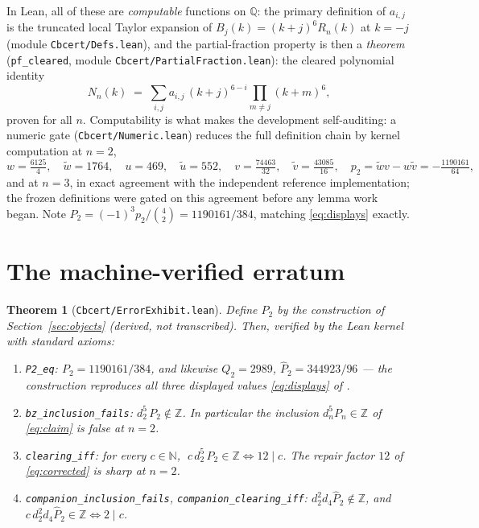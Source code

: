 \documentclass[11pt]{article}
\newtheorem{theorem}{Theorem}
\theoremstyle{definition}
\newcommand{\Z}{\mathbb{Z}}
\newcommand{\Q}{\mathbb{Q}}
\newcommand{\bin}[2]{\binom{#1}{#2}}
\newcommand{\wtd}{\widetilde}
\newcommand{\lean}[1]{\texttt{#1}}
\begin{document}
In Lean, all of these are \emph{computable} functions on $\Q$: the primary
definition of $a_{i,j}$ is the truncated local Taylor expansion of
$B_j(k) = (k+j)^6 R_n(k)$ at $k = -j$ (module \lean{Cbcert/Defs.lean}), and
the partial-fraction property is then a \emph{theorem}
(\lean{pf\_cleared}, module \lean{Cbcert/PartialFraction.lean}): the cleared
polynomial identity
\[
N_n(k) \;=\; \sum_{i,j} a_{i,j}\,(k+j)^{6-i}\prod_{m \ne j}(k+m)^6,
\]
proven for all $n$. Computability is what makes the development
self-auditing: a numeric gate (\lean{Cbcert/Numeric.lean}) reduces the full
definition chain by kernel computation at $n = 2$,
\[
w = \tfrac{6125}{4},\quad \wtd w = 1764,\quad u = 469,\quad \wtd u = 552,\quad
v = \tfrac{74463}{32},\quad \wtd v = \tfrac{43085}{16},\quad
p_2 = \wtd w v - w\wtd v = -\tfrac{1190161}{64},
\]
and at $n = 3$, in exact agreement with the independent reference
implementation; the frozen definitions were gated on this agreement before
any lemma work began. Note $P_2 = (-1)^{3} p_2/\bin{4}{2} = 1190161/384$,
matching \eqref{eq:displays} exactly.

\section{The machine-verified erratum}\label{sec:erratum}

\begin{theorem}[{\lean{Cbcert/ErrorExhibit.lean}}]\label{thm:erratum}
Define $P_2$ by the construction of Section~\ref{sec:objects}
\textup{(}derived, not transcribed\textup{)}. Then, verified by the Lean
kernel with standard axioms:
\begin{enumerate}[label=\textup{(\roman*)}]
\item \lean{P2\_eq}: $P_2 = 1190161/384$, and likewise
$Q_2 = 2989$, $\widehat P_2 = 344923/96$ --- the construction reproduces
\emph{all three} displayed values \eqref{eq:displays} of \cite{BZ22}.
\item \lean{bz\_inclusion\_fails}: $d_2^5\,P_2 \notin \Z$. In particular the
inclusion $d_n^5 P_n \in \Z$ of \eqref{eq:claim} is false at $n = 2$.
\item \lean{clearing\_iff}: for every $c \in \mathbb{N}$,
$\;c\,d_2^5\,P_2 \in \Z \iff 12 \mid c$. The repair factor $12$ of
\eqref{eq:corrected} is sharp at $n=2$.
\item \lean{companion\_inclusion\_fails}, \lean{companion\_clearing\_iff}:
$d_2^2 d_4 \widehat P_2 \notin \Z$, and
$c\,d_2^2 d_4 \widehat P_2 \in \Z \iff 2 \mid c$.
\end{enumerate}
\end{theorem}
\end{document}
